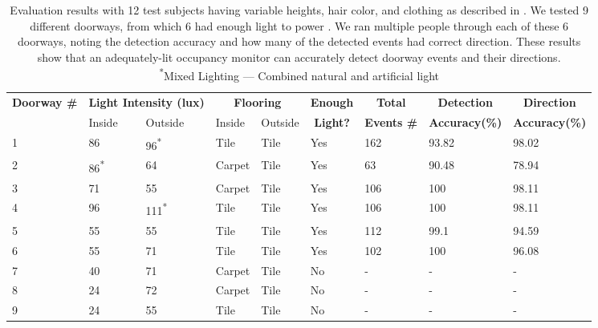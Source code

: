 \begin{table}[t]
\footnotesize
	\begin{tabular}{@{}p{0.6in}p{0.5in}p{0.5in}p{0.45in}p{0.6in}p{0.3in}p{0.7in}p{0.7in}p{0.5in}@{}}
	\toprule
	\multirow{2}{*}{\textbf{Doorway \#}}	&	\multicolumn{2}{c}{\textbf{Light Intensity (lux)}} & \multicolumn{2}{c}{\textbf{Flooring}} & \multicolumn{1}{c}{\textbf{Enough}} & \multicolumn{1}{c}{\textbf{Total}} & \multicolumn{1}{c}{\textbf{Detection}} & \multicolumn{1}{c}{\textbf{Direction}} 		\\
	& Inside & Outside & Inside & Outside & \multicolumn{1}{c}{\textbf{Light?}} & \multicolumn{1}{c}{\textbf{Events \#}} & \multicolumn{1}{c}{\textbf{Accuracy(\%)}} & \multicolumn{1}{c}{\textbf{Accuracy(\%)}}\\\midrule
	1 & 86 & 96\textsuperscript{*} & Tile & Tile & Yes & 162 & 93.82 & 98.02 \\ %
	2 & 86\textsuperscript{*} & 64 & Carpet & Tile & Yes & 63 & 90.48 & 78.94 \\ %
	3 & 71 & 55 & Carpet & Tile & Yes & 106 & 100 & 98.11 \\	%
	4 & 96 & 111\textsuperscript{*} & Tile & Tile & Yes & 106 & 100 & 98.11 \\ %
	5 & 55 & 55 & Tile & Tile & Yes & 112 & 99.1 & 94.59 \\ %
	6 & 55 & 71 & Tile & Tile & Yes & 102 & 100 & 96.08 \\\midrule %
	7 & 40 & 71 & Carpet & Tile & No & - & - & - \\ %
	8 & 24 & 72 & Carpet & Tile & No & - & - & - \\ %
	9 & 24 & 55 & Tile & Tile & No & - & - & - \\ %
	\bottomrule
	\end{tabular}
	\caption{Evaluation results with 12 test subjects having variable heights, hair color, and clothing as described in . We tested 9 different doorways, from which 6 had enough light to power \sysname. We ran multiple people through each of these 6 doorways, noting the detection accuracy and how many of the detected events had correct direction. These results show that an adequately-lit \sysname occupancy monitor can accurately detect doorway events and their directions.
	\vspace{1mm}
	\\\textsuperscript{*}Mixed Lighting --- Combined natural and artificial light
	\label{tab:detection}}

\end{table}



